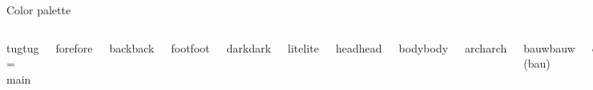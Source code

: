 \documentclass[table,aspectratio=43]{beamer}
\begin{document}
  \begin{frame}{Color palette}
    \begin{columns}[t]
      \begin{beamercolorbox}[colsep*=4pt]{tug}tug = main\end{beamercolorbox}
      \begin{beamercolorbox}[colsep*=4pt]{fore}fore\end{beamercolorbox}
      \begin{beamercolorbox}[colsep*=4pt]{back}back\end{beamercolorbox}
      \begin{beamercolorbox}[colsep*=4pt]{foot}foot\end{beamercolorbox}
      \begin{beamercolorbox}[colsep*=4pt]{dark}dark\end{beamercolorbox}
      \begin{beamercolorbox}[colsep*=4pt]{lite}lite\end{beamercolorbox}
      \begin{beamercolorbox}[colsep*=4pt]{head}head\end{beamercolorbox}
      \begin{beamercolorbox}[colsep*=4pt]{body}body\end{beamercolorbox}
      \begin{beamercolorbox}[colsep*=4pt]{arch}arch\end{beamercolorbox}
      \begin{beamercolorbox}[colsep*=4pt]{bauw}bauw (bau)\end{beamercolorbox}
      \begin{beamercolorbox}[colsep*=4pt]{etec}etec (etit)\end{beamercolorbox}
      \begin{beamercolorbox}[colsep*=4pt]{mach}mach (mbww)\!\!\end{beamercolorbox}
      \begin{beamercolorbox}[colsep*=4pt]{chem}chem (tcvp)\end{beamercolorbox}
      \begin{beamercolorbox}[colsep*=4pt]{info}info (infbio)\end{beamercolorbox}
      \begin{beamercolorbox}[colsep*=4pt]{math}math (mpug)\end{beamercolorbox}

\end{columns}
\end{frame}
\end{document}
